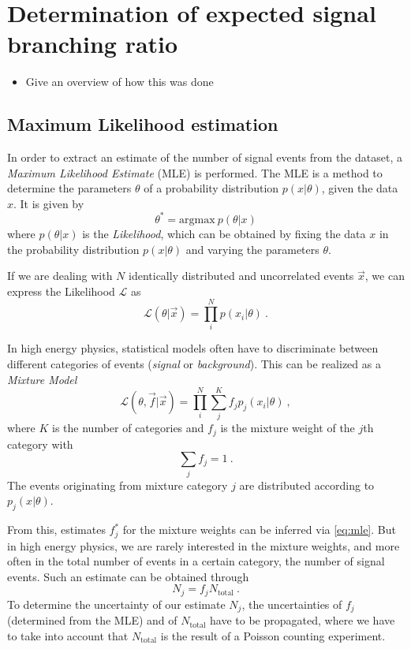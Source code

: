 \chapter{Determination of expected signal branching ratio} %

\begin{itemize}
  \item Give an overview of how this was done
\end{itemize}

\section{Maximum Likelihood estimation}

In order to extract an estimate of the number of signal events from the dataset, a \textit{Maximum Likelihood Estimate} (MLE) is performed.
The MLE is a method to determine the parameters $θ$ of a probability distribution $p(x | θ)$, given the data $x$.
It is given by
\begin{equation}
  θ^* = \mathrm{argmax}\ p(θ | x)
  \label{eq:mle}
\end{equation}
where $p(θ | x)$ is the \textit{Likelihood}, which can be obtained by fixing the data $x$ in the probability distribution $p(x | θ)$ and varying the parameters $θ$.

If we are dealing with $N$ identically distributed and uncorrelated events $\vec{x}$, we can express the Likelihood $\mathcal{L}$ as
\begin{equation}
  \mathcal{L}(θ | \vec{x}) = \prod_i^N p(x_i | θ)\:.
\end{equation}

In high energy physics, statistical models often have to discriminate between different categories of events (\eg \textit{signal} or \textit{background}).
This can be realized as a \textit{Mixture Model}
\begin{equation}
  \mathcal{L}(θ, \vec{f} | \vec{x}) = \prod_i^N \sum_j^K f_j p_j(x_i | θ)\:,
\end{equation}
where $K$ is the number of categories and $f_j$ is the mixture weight of the $j$th category with
\begin{equation}
  \sum_j f_j = 1\:.
\end{equation}
The events originating from mixture category $j$ are distributed according to $p_j(x | θ)$.

From this, estimates $f_j^*$ for the mixture weights can be inferred via \eqref{eq:mle}.
But in high energy physics, we are rarely interested in the mixture weights, and more often in the total number of events in a certain category, \eg the number of signal events.
Such an estimate can be obtained through
\begin{equation}
  N_j = f_j N_\text{total}\:.
\end{equation}
To determine the uncertainty of our estimate $N_j$, the uncertainties of $f_j$ (determined from the MLE) and of $N_\text{total}$ have to be propagated, where we have to take into account that $N_\text{total}$ is the result of a Poisson counting experiment.

